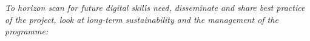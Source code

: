 \documentclass[conference]{IEEEtran}
\begin{document}
{\emph{To horizon scan for future digital skills need, disseminate and
share best practice of the project, look at long-term sustainability
and the management of the programme:}}\newline




\end{document}
